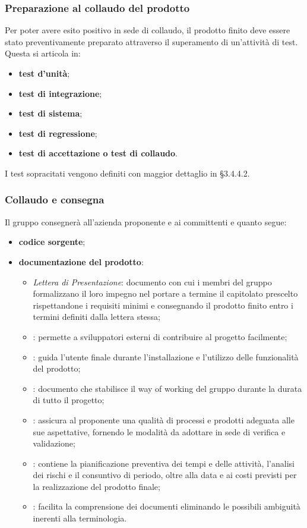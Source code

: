 \subsubsection{Preparazione al collaudo del prodotto}
Per poter avere esito positivo in sede di collaudo, il prodotto finito deve essere stato preventivamente preparato attraverso il superamento di un'attività di test. Questa si articola
in:
\begin{itemize}
	\item \textbf{test d'unità};
	\item \textbf{test di integrazione};
	\item \textbf{test di sistema};
	\item \textbf{test di regressione};
	\item \textbf{test di accettazione o test di collaudo}.
\end{itemize}
I test sopracitati vengono definiti con maggior dettaglio in §3.4.4.2.

\subsubsection{Collaudo e consegna}
Il gruppo \Omicron{} consegnerà all'azienda proponente e ai committenti \textit{\VT} e \textit{\CR} quanto segue:
\begin{itemize}
	\item \textbf{codice sorgente};
	\item \textbf{documentazione del prodotto}:
	\begin{itemize}
		\item \textit{Lettera di Presentazione}: documento con cui i membri del gruppo \Omicron{} formalizzano il loro impegno nel portare a termine il capitolato prescelto rispettandone i requisiti minimi e consegnando il prodotto finito entro i termini definiti dalla lettera stessa;
		\item {}: permette a sviluppatori esterni di contribuire al progetto facilmente;
		\item {}: guida l'utente finale durante l'installazione e l'utilizzo delle funzionalità del prodotto;
		\item {}: documento che stabilisce il way of working del gruppo durante la durata di tutto il progetto;
		\item {}: assicura al proponente una qualità di processi e prodotti adeguata alle sue aspettative, fornendo le modalità da adottare in sede di verifica e validazione;
		\item {}: contiene la pianificazione preventiva dei tempi e delle attività, l'analisi dei rischi e il consuntivo di periodo, oltre alla data e ai costi previsti per la realizzazione del prodotto finale;
		\item {}: facilita la comprensione dei documenti eliminando le possibili ambiguità inerenti alla terminologia.
	\end{itemize}
\end{itemize}

